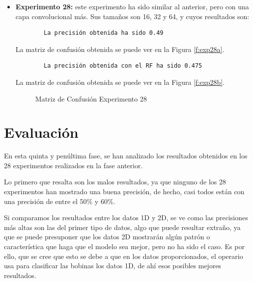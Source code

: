 \begin{itemize}
    \item \textbf{Experimento 28:} este experimento ha sido similar al anterior, pero con una capa convolucional más. Sus tamaños son 16, 32 y 64, y cuyos resultados son:
    \begin{verbatim}
        La precisión obtenida ha sido 0.49
    \end{verbatim}
    La matriz de confusión obtenida se puede ver en la Figura \ref{f:exp28a}.
    \begin{verbatim}
        La precisión obtenida con el RF ha sido 0.475
    \end{verbatim}
    La matriz de confusión obtenida se puede ver en la Figura \ref{f:exp28b}.
    \begin{figure}[h]
     \centering
     \caption{Matriz de Confusión Experimento 28}
     \label{f:exp28}
    \end{figure}    
    
\end{itemize}

\section{Evaluación}
En esta quinta y penúltima fase, se han analizado los resultados obtenidos en los 28 experimentos realizados en la fase anterior.  

Lo primero que resalta son los malos resultados, ya que ninguno de los 28 experimentos han mostrado una buena precisión, de hecho, casi todos están con una precisión de entre el 50\% y 60\%.

Si comparamos los resultados entre los datos 1D y 2D, se ve como las precisiones más altas son las del primer tipo de datos, algo que puede resultar extraño, ya que se puede presuponer que los datos 2D mostrarán algún patrón o característica que haga que el modelo sea mejor, pero no ha sido el caso. Es por ello, que se cree que esto se debe a que en los datos proporcionados, el operario usa para clasificar las bobinas los datos 1D, de ahí esos posibles mejores resultados.


